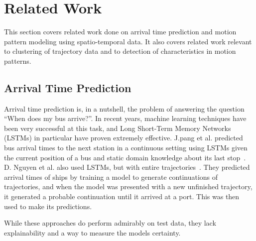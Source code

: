 \chapter{Related Work}
\label{cha:theory}

This section covers related work done on arrival time prediction 
and motion pattern modeling using spatio-temporal data. It
also covers related work relevant to clustering of trajectory data
and to detection of characteristics in motion patterns.

\section{Arrival Time Prediction}
Arrival time prediction is, in a nutshell, the problem of answering
the question ``When does my bus arrive?''. In recent years, machine learning
techniques have been very successful at this task, and Long Short-Term 
Memory Networks (LSTMs) in particular have proven
extremely effective. J.pang et al. predicted bus arrival times to the next station in a
continuous setting using LSTMs given the current position of a bus and static domain knowledge
about its last stop~\cite{pang2018learning}. 
D. Nguyen et al. also used LSTMs, but with entire
trajectories~\cite{Nguyen2018Jun}. They predicted arrival times of
ships by training a model to generate continuations of trajectories, and  
when the model was presented with a new unfinished trajectory, it generated a
probable continuation until it arrived at a port. This was then used to
make its predictions.

While these approaches do perform admirably on test
data, they lack explainability and a way to measure the models certainty.

